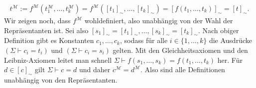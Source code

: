 \begin{solution}
\begin{align*}
t^\mathscr{M} := f^\mathscr{M}(t_1^\mathscr{M}, \dots, t_k^\mathscr{M}) = f^\mathscr{M}([t_1]_\sim, \dots, [t_k]_\sim) = [f(t_1, \dots, t_k)]_\sim = [t]_\sim.
\end{align*}
Wir zeigen noch, dass $f^{\mathscr{M}}$ wohldefiniert, also unabhängig von der Wahl
der Repräsentanten ist. Sei also $[s_1]_\sim = [t_1]_\sim, \dots, [s_k]_\sim = [t_k]_\sim$. Nach obiger Definition gibt es Konstanten $c_1,\dots,c_k$, sodass für alle $i \in \{1, \dots, k\}$ die Ausdrücke
$(\Sigma \vdash c_i  = t_i)$ und $(\Sigma \vdash c_i  = s_i)$ gelten. Mit den Gleichheitsaxiomen und den Leibniz-Axiomen leitet man schnell $\Sigma \vdash f(s_1,\dots,s_k) = f(t_1,\dots,t_k)$ her. Für $d \in [c]_\sim$ gilt $\Sigma \vdash c = d$ und daher $c^\mathscr{M} = d^\mathscr{M}$. Also sind alle Definitionen unabhängig von den Repräsentanten.
\end{solution}

